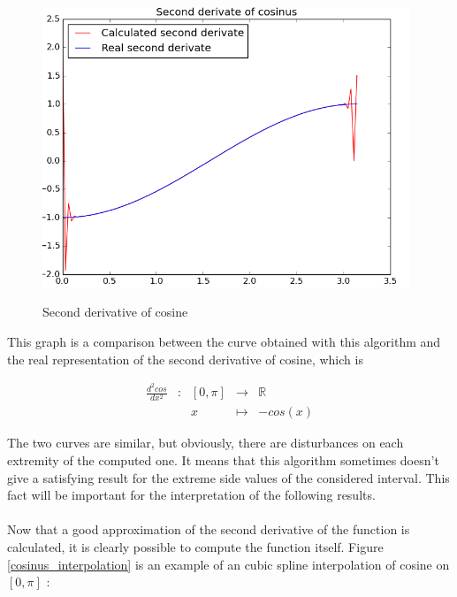 \documentclass{article}
\begin{document}
\begin{figure}[h]
  \centering
  \caption{Second derivative of cosine}
  \includegraphics[width=11cm]{cosinus_second_derivate}
  \label{cosinus_second_derivate}
\end{figure}

This graph is a comparison between the curve obtained with this algorithm and the real representation of the second derivative of cosine, which is

\begin{equation}
\begin{array}{ccccl}
\frac{d^2 cos}{dx^2} & : & [0, \pi] & \to & \mathbb{R} \\
 & & x & \mapsto & -cos(x)
\end{array}
\end{equation}

The two curves are similar, but obviously, there are disturbances on each extremity of the computed one. It means that this algorithm sometimes doesn't give a satisfying result for the extreme side values of the considered interval. This fact will be important for the interpretation of the following results.\\\\

Now that a good approximation of the second derivative of the function is calculated, it is clearly possible to compute the function itself. Figure \ref{cosinus_interpolation} is an example of an cubic spline interpolation of cosine on $[0, \pi]$ :
\end{document}
